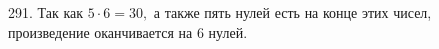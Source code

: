291. Так как $5\cdot6=30,$ а также пять нулей есть на конце этих чисел, произведение оканчивается на 6 нулей.\\
